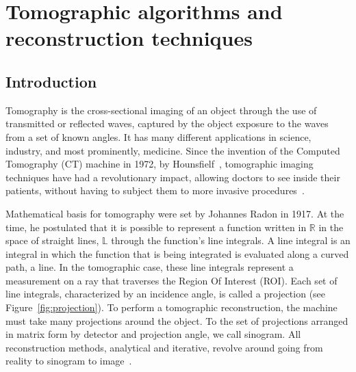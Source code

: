 
\section{Tomographic algorithms and reconstruction techniques}%
\label{sec:tomographic_algorithms_and_reconstruction_techniques}

\subsection{Introduction}%
\label{sub:introduction}

Tomography is the cross-sectional imaging of an object through the use
of transmitted or reflected waves, captured by the object exposure to
the waves from a set of known angles. It has many different applications
in science, industry, and most prominently, medicine. Since the
invention of the Computed Tomography (\gls{CT}) machine in 1972, by
Hounsfielf~\cite{Gunderman2006}, tomographic imaging techniques have had
a revolutionary impact, allowing doctors to see inside their patients,
without having to subject them to more invasive
procedures~\cite{Kak2001}.

Mathematical basis for tomography were set by Johannes Radon in 1917. At
the time, he postulated that  it is possible to represent a function
written in $\mathbb{R}$ in the space of straight lines, $\mathbb{L}$
through the function's line integrals. A line integral is an integral in
which the function that is being integrated is evaluated along a curved
path, a line. In the tomographic case, these line integrals represent a
measurement on a ray that traverses the Region Of Interest (\gls{ROI}).
Each set of line integrals, characterized by an incidence angle, is
called a projection (see Figure~\ref{fig:projection}). To perform a
tomographic reconstruction, the machine must take many projections
around the object. To the set of projections arranged in matrix form by
detector and projection angle, we call sinogram. All reconstruction
methods, analytical and iterative, revolve around going from reality to
sinogram to image~\cite{Bruyant2002, Kak2001, Herman1973, Herman1995,
Herman2009, Defrise2003}.

